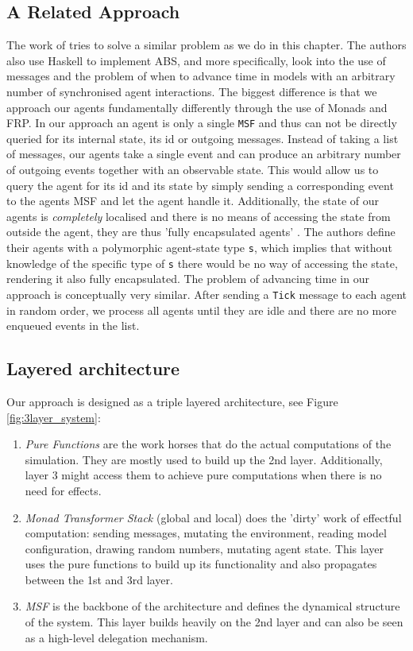 \subsection{A Related Approach}
The work of \cite{botta_time_2010} tries to solve a similar problem as we do in this chapter. The authors also use Haskell to implement ABS, and more specifically, look into the use of messages and the problem of when to advance time in models with an arbitrary number of synchronised agent interactions.
The biggest difference is that we approach our agents fundamentally differently through the use of Monads and FRP. In our approach an agent is only a single \texttt{MSF} and thus can not be directly queried for its internal state, its id or outgoing messages. Instead of taking a list of messages, our agents take a single event and can produce an arbitrary number of outgoing events together with an observable state. This would allow us to query the agent for its id and its state by simply sending a corresponding event to the agents MSF and let the agent handle it. Additionally, the state of our agents is \textit{completely} localised and there is no means of accessing the state from outside the agent, they are thus 'fully encapsulated agents' \cite{botta_time_2010}. The authors define their agents with a polymorphic agent-state type \texttt{s}, which implies that without knowledge of the specific type of \texttt{s} there would be no way of accessing the state, rendering it also fully encapsulated.
The problem of advancing time in our approach is conceptually very similar. After sending a \texttt{Tick} message to each agent in random order, we process all agents until they are idle and there are no more enqueued events in the list. %

\subsection{Layered architecture}
Our approach is designed as a triple layered architecture, see Figure \ref{fig:3layer_system}:
\begin{enumerate}
	\item \textit{Pure Functions} are the work horses that do the actual computations of the simulation. They are mostly used to build up the 2nd layer. Additionally, layer 3 might access them to achieve pure computations when there is no need for effects.
	
	\item \textit{Monad Transformer Stack} (global and local) does the 'dirty' work of effectful computation: sending messages, mutating the environment, reading model configuration, drawing random numbers, mutating agent state. This layer uses the pure functions to build up its functionality and also propagates between the 1st and 3rd layer.
	
	\item \textit{MSF} is the backbone of the architecture and defines the dynamical structure of the system. This layer builds heavily on the 2nd layer and can also be seen as a high-level delegation mechanism.
\end{enumerate}

